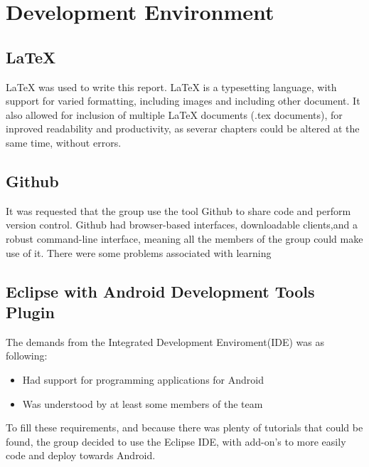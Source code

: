 \chapter{Development Environment}

\section{LaTeX}
LaTeX was used to write this report. LaTeX is a typesetting language, with support for varied formatting, including images and including other document. It also allowed for inclusion of multiple LaTeX documents (.tex documents), for inproved readability and productivity, as severar chapters could be altered at the same time, without errors.
\section{Github}
It was requested that the group use the tool Github to share code and perform version control. Github had browser-based interfaces, downloadable clients,and a robust command-line interface, meaning all the members of the group could make use of it. There were some problems associated with learning

\section{Eclipse with Android Development Tools Plugin}
The demands from the Integrated Development Enviroment(IDE) was as following:
\begin{itemize}
\item Had support for programming applications for Android
\item Was understood by at least some members of the team
\end{itemize}
To fill these requirements, and because there was plenty of tutorials that could be found, the group decided to use the Eclipse IDE, with add-on's to more easily code and deploy towards Android. 


 